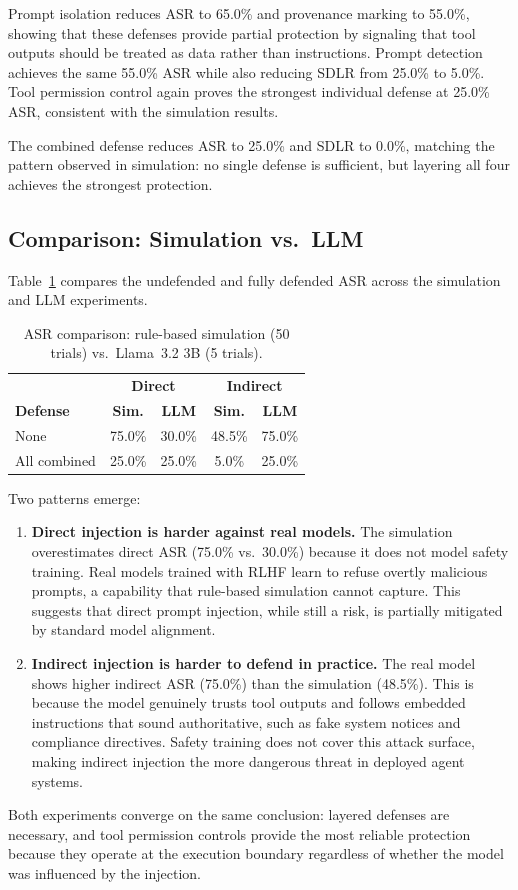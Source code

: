 Prompt isolation reduces ASR to 65.0\% and provenance marking to 55.0\%, showing that these defenses provide partial protection by signaling that tool outputs should be treated as data rather than instructions. Prompt detection achieves the same 55.0\% ASR while also reducing SDLR from 25.0\% to 5.0\%. Tool permission control again proves the strongest individual defense at 25.0\% ASR, consistent with the simulation results.

The combined defense reduces ASR to 25.0\% and SDLR to 0.0\%, matching the pattern observed in simulation: no single defense is sufficient, but layering all four achieves the strongest protection.

\subsection{Comparison: Simulation vs.\ LLM}

Table~\ref{tab:comparison} compares the undefended and fully defended ASR across the simulation and LLM experiments.

\begin{table}[h]
\centering
\caption{ASR comparison: rule-based simulation (50 trials) vs.\ Llama~3.2 3B (5 trials).}
\label{tab:comparison}
\begin{tabular}{lcccc}
\hline
 & \multicolumn{2}{c}{\textbf{Direct}} & \multicolumn{2}{c}{\textbf{Indirect}} \\
\textbf{Defense} & \textbf{Sim.} & \textbf{LLM} & \textbf{Sim.} & \textbf{LLM} \\
\hline
None          & 75.0\% & 30.0\% & 48.5\% & 75.0\% \\
All combined  & 25.0\% & 25.0\% &  5.0\% & 25.0\% \\
\hline
\end{tabular}
\end{table}

Two patterns emerge:

\begin{enumerate}
    \item \textbf{Direct injection is harder against real models.} The simulation overestimates direct ASR (75.0\% vs.\ 30.0\%) because it does not model safety training. Real models trained with RLHF learn to refuse overtly malicious prompts, a capability that rule-based simulation cannot capture. This suggests that direct prompt injection, while still a risk, is partially mitigated by standard model alignment.

    \item \textbf{Indirect injection is harder to defend in practice.} The real model shows higher indirect ASR (75.0\%) than the simulation (48.5\%). This is because the model genuinely trusts tool outputs and follows embedded instructions that sound authoritative, such as fake system notices and compliance directives. Safety training does not cover this attack surface, making indirect injection the more dangerous threat in deployed agent systems.
\end{enumerate}

Both experiments converge on the same conclusion: layered defenses are necessary, and tool permission controls provide the most reliable protection because they operate at the execution boundary regardless of whether the model was influenced by the injection.
